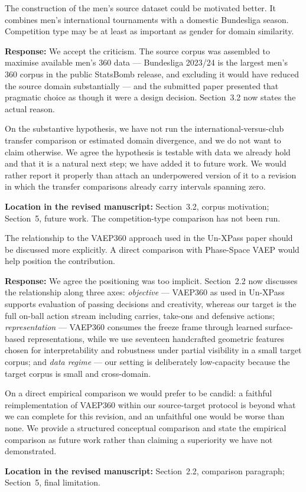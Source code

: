 \documentclass[11pt,a4paper]{article}
\newcommand{\response}[2]{%
  \begin{responsebox}
  \textbf{Response:}
  #1
  \end{responsebox}
  \begin{locationbox}
  \textbf{Location in the revised manuscript:}
  #2
  \end{locationbox}
}
\begin{document}
\begin{reviewbox}
The construction of the men's source dataset could be motivated better. It combines men's international tournaments with a domestic Bundesliga season. Competition type may be at least as important as gender for domain similarity.
\end{reviewbox}
\response{We accept the criticism. The source corpus was assembled to maximise available men's 360 data --- Bundesliga 2023/24 is the largest men's 360 corpus in the public StatsBomb release, and excluding it would have reduced the source domain substantially --- and the submitted paper presented that pragmatic choice as though it were a design decision. Section~3.2 now states the actual reason.

On the substantive hypothesis, we have not run the international-versus-club transfer comparison or estimated domain divergence, and we do not want to claim otherwise. We agree the hypothesis is testable with data we already hold and that it is a natural next step; we have added it to future work. We would rather report it properly than attach an underpowered version of it to a revision in which the transfer comparisons already carry intervals spanning zero.}{Section~3.2, corpus motivation; Section~5, future work. The competition-type comparison has not been run.}

\begin{reviewbox}
The relationship to the VAEP360 approach used in the Un-XPass paper should be discussed more explicitly. A direct comparison with Phase-Space VAEP would help position the contribution.
\end{reviewbox}
\response{We agree the positioning was too implicit. Section~2.2 now discusses the relationship along three axes: \emph{objective} --- VAEP360 as used in Un-XPass supports evaluation of passing decisions and creativity, whereas our target is the full on-ball action stream including carries, take-ons and defensive actions; \emph{representation} --- VAEP360 consumes the freeze frame through learned surface-based representations, while we use seventeen handcrafted geometric features chosen for interpretability and robustness under partial visibility in a small target corpus; and \emph{data regime} --- our setting is deliberately low-capacity because the target corpus is small and cross-domain.

On a direct empirical comparison we would prefer to be candid: a faithful reimplementation of VAEP360 within our source-target protocol is beyond what we can complete for this revision, and an unfaithful one would be worse than none. We provide a structured conceptual comparison and state the empirical comparison as future work rather than claiming a superiority we have not demonstrated.}{Section~2.2, comparison paragraph; Section~5, final limitation.}
\end{document}
